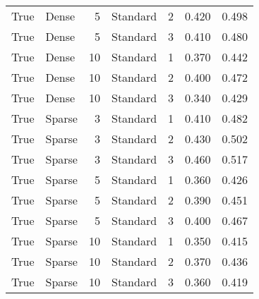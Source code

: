 \begin{tabular}{rlrlrrr}
True & Dense & 5 & Standard & 2 & 0.420 & 0.498 \\
True & Dense & 5 & Standard & 3 & 0.410 & 0.480 \\
True & Dense & 10 & Standard & 1 & 0.370 & 0.442 \\
True & Dense & 10 & Standard & 2 & 0.400 & 0.472 \\
True & Dense & 10 & Standard & 3 & 0.340 & 0.429 \\
True & Sparse & 3 & Standard & 1 & 0.410 & 0.482 \\
True & Sparse & 3 & Standard & 2 & 0.430 & 0.502 \\
True & Sparse & 3 & Standard & 3 & 0.460 & 0.517 \\
True & Sparse & 5 & Standard & 1 & 0.360 & 0.426 \\
True & Sparse & 5 & Standard & 2 & 0.390 & 0.451 \\
True & Sparse & 5 & Standard & 3 & 0.400 & 0.467 \\
True & Sparse & 10 & Standard & 1 & 0.350 & 0.415 \\
True & Sparse & 10 & Standard & 2 & 0.370 & 0.436 \\
True & Sparse & 10 & Standard & 3 & 0.360 & 0.419 \\
\bottomrule
\end{tabular}
